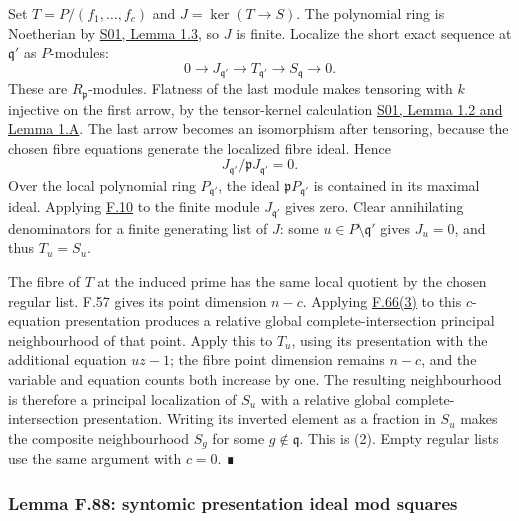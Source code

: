\documentclass[11pt,a4paper,openany]{report}
\begin{document}
Set \(T=P/(f_1,\ldots,f_c)\) and \(J=\ker(T\to S)\). The polynomial ring is Noetherian by \href{https://github.com/KokunoYumeto/open-math-courses/blob/main/docs/courses/AG-RG/AG-RG-S01.md}{S01, Lemma 1.3}, so \(J\) is finite. Localize the short exact sequence at \(\mathfrak q'\) as \(P\)-modules: \[
0\longrightarrow J_{\mathfrak q'}\longrightarrow T_{\mathfrak q'}\longrightarrow S_{\mathfrak q}\longrightarrow0.
\] These are \(R_{\mathfrak p}\)-modules. Flatness of the last module makes tensoring with \(k\) injective on the first arrow, by the tensor-kernel calculation \href{https://github.com/KokunoYumeto/open-math-courses/blob/main/docs/courses/AG-RG/AG-RG-S01.md}{S01, Lemma 1.2 and Lemma 1.A}. The last arrow becomes an isomorphism after tensoring, because the chosen fibre equations generate the localized fibre ideal. Hence \[
J_{\mathfrak q'}/\mathfrak pJ_{\mathfrak q'}=0.
\] Over the local polynomial ring \(P_{\mathfrak q'}\), the ideal \(\mathfrak pP_{\mathfrak q'}\) is contained in its maximal ideal. Applying \hyperref[AG-RG-S05-algebra-lemma-NAK]{F.10} to the finite module \(J_{\mathfrak q'}\) gives zero. Clear annihilating denominators for a finite generating list of \(J\): some \(u\in P\setminus\mathfrak q'\) gives \(J_u=0\), and thus \(T_u=S_u\).

The fibre of \(T\) at the induced prime has the same local quotient by the chosen regular list. F.57 gives its point dimension \(n-c\). Applying \hyperref[AG-RG-S05-algebra-lemma-localize-relative-complete-intersection]{F.66(3)} to this \(c\)-equation presentation produces a relative global complete-intersection principal neighbourhood of that point. Apply this to \(T_u\), using its presentation with the additional equation \(uz-1\); the fibre point dimension remains \(n-c\), and the variable and equation counts both increase by one. The resulting neighbourhood is therefore a principal localization of \(S_u\) with a relative global complete-intersection presentation. Writing its inverted element as a fraction in \(S_u\) makes the composite neighbourhood \(S_g\) for some \(g\notin\mathfrak q\). This is (2). Empty regular lists use the same argument with \(c=0\). ∎

\label{AG-RG-S05-algebra-lemma-syntomic-presentation-ideal-mod-squares}

\subsubsection{Lemma F.88: syntomic presentation ideal mod squares}\label{AG-RG-S05-lemma-f.88-syntomic-presentation-ideal-mod-squares}
\end{document}

